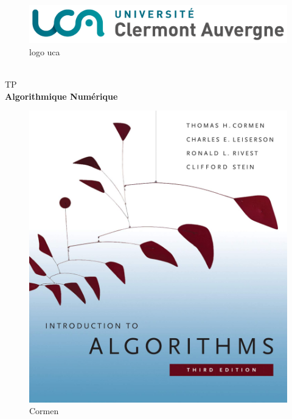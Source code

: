 \documentclass[a4paper]{article}
\begin{document}
\begin{titlepage}
  \begin{center}
    
    \begin{figure}[h]
      \centering
      \includegraphics[scale=0.3]{./img/logo.png}
      \caption{logo uca}
      \label{uca}
    \end{figure}
    \\[1.5cm]
    \textsc{\LARGE TP}\\[0.5cm]
    
    {\huge \bfseries Algorithmique Numérique\\[0.4cm]}

    \begin{figure}[h]
      \centering
      \includegraphics[scale=0.2]{./img/cormen.jpg}
      \caption{Cormen}
    \end{figure}


\end{center}
\end{titlepage}
\end{document}
